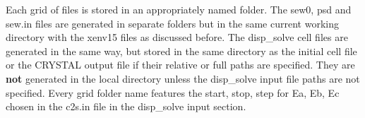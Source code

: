 Each grid of files is stored in an appropriately named folder. The sew0, psd and sew.in files are generated in separate folders but in the same current working directory with the xenv15 files as discussed before.
The disp\_solve cell files are generated in the same way, but stored in the same directory as the initial cell file or the CRYSTAL output file if their relative or full paths are specified.
They are \textbf{not} generated in the local directory unless the disp\_solve input file paths are not specified. Every grid folder name features the start, stop, step for Ea, Eb, Ec chosen in the c2s.in file in the disp\_solve input section.
